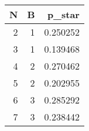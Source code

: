 \begin{tabular}{rrr}
\toprule
N & B & p_star \\
\midrule
2 & 1 & 0.250252 \\
3 & 1 & 0.139468 \\
4 & 2 & 0.270462 \\
5 & 2 & 0.202955 \\
6 & 3 & 0.285292 \\
7 & 3 & 0.238442 \\
\bottomrule
\end{tabular}
